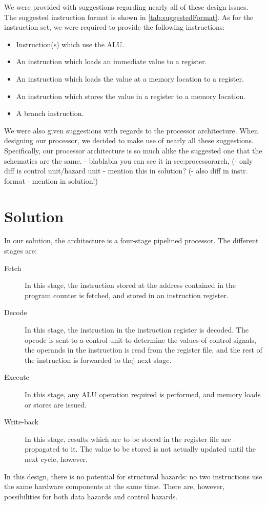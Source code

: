 \documentclass[11pt]{article}
\begin{document}
We were provided with suggestions regarding nearly all of these design
issues. The suggested instruction format is shown in
\autoref{tab:suggestedFormat}. As for the instruction set, we
were required to provide the following instructions:
\begin{itemize}
\item Instruction(s) which use the ALU.
\item An instruction which loads an immediate value to a register.
\item An instruction which loads the value at a memory location to a register.
\item An instruction which stores the value in a register to a memory location.
\item A branch instruction.
\end{itemize}

We were also given suggestions with regards to the processor
architecture. When designing our processor, we decided to make use of
nearly all these suggestions. Specifically, our processor architecture
is so much alike the suggested one that the schematics are the same. 
- blablabla you can see it in sec:processorarch, 
(- only diff is control unit/hazard unit - mention this in solution? 
(- also diff in instr. format - mention in solution!)


\section{Solution}
\label{sec:solution} 
In our solution, the architecture is a four-stage pipelined
processor. The different stages are:
\begin{description}
\item[Fetch] In this stage, the instruction stored at the address
  contained in the program counter is fetched, and stored in an
  instruction register.
\item[Decode] In this stage, the instruction in the instruction
  register is decoded. The opcode is sent to a control unit to
  determine the values of control signals, the operands in the
  instruction is read from the register file, and the rest of the
  instruction is forwarded to thej next stage. 
\item[Execute] In this stage, any ALU operation required is performed,
  and memory loads or stores are issued.
\item[Write-back] In this stage, results which are to be stored in the
  register file are propagated to it. The value to be stored is not
  actually updated until the next cycle, however.
\end{description}
In this design, there is no potential for structural hazards: no two
instructions use the same hardware components at the same time. There
are, however, possibilities for both data hazards and control hazards. 
\end{document}
